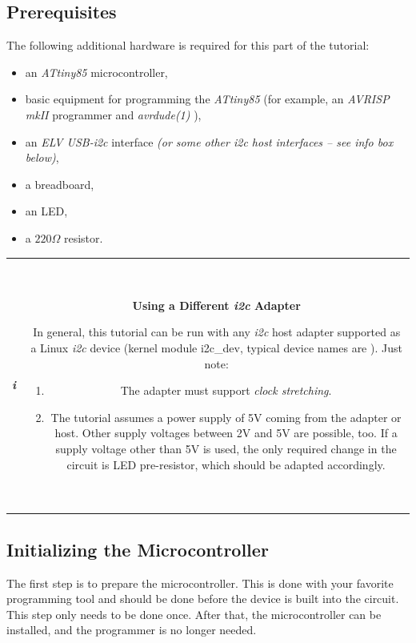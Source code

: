 \documentclass[12pt,english,parskip=half,headheight=19pt]{scrreprt}
\newcommand{\lst}[1]{\colorbox{lstbackground}{\footnotesize\code{#1}}}
\newcommand{\lstf}[1]{\colorbox{lstbackground}{\ttfamily\footnotesize#1}}
\newcommand{\infobox}[1]{
  \par
  \medskip
  \hfill
  \setlength\arrayrulewidth{1pt}
  \begin{tabular}[t]{c|c|}
    \parbox{1.8em}{\hfill\textit{\Huge\textbf{i}\,}}
    &
    \,\parbox{0.89\linewidth}{\setlength{\parskip}{0.5em} \small #1}\,
  \end{tabular}
  \medskip
  \par
}
\begin{document}
\subsection{Prerequisites}
\label{sec:tutorial-brownies-prerequisites}

The following additional hardware is required for this part of the tutorial:
\begin{itemize}
  \item an \textit{ATtiny85} microcontroller,
  \item basic equipment for programming the \textit{ATtiny85}
        (for example, an \textit{AVRISP mkII} programmer and \textit{avrdude(1)} ),
  \item an \textit{ELV USB-i2c} interface
        \textit{(or some other \textit{i2c} host interfaces -- see info box below)},
  \item a breadboard,
  \item an LED,
  \item a $220\Omega$ resistor.
\end{itemize}

\infobox{
  \textbf{Using a Different \textit{i2c} Adapter}

  In general, this tutorial can be run with any \textit{i2c} host adapter supported as a Linux
  \textit{i2c} device (kernel module \lstf{i2c\_dev}, typical device names are \lst{/dev/i2c-*}).
  Just note:
  \begin{enumerate}
    \item The adapter must support \textit{clock stretching}.
    \item The tutorial assumes a power supply of 5V coming from the adapter or host. Other supply voltages
          between 2V and 5V are possible, too. If a supply voltage other than 5V is used, the only 
          required change in the circuit is LED pre-resistor, which should be adapted accordingly.
  \end{enumerate}
}



\subsection{Initializing the Microcontroller}
\label{sec:tutorial-brownies-init}

The first step is to prepare the microcontroller. This is done with your favorite programming tool and should be done before the device is built into the circuit. This step only needs to be done once. After that, the microcontroller can be installed, and the programmer is no longer needed.
\end{document}

